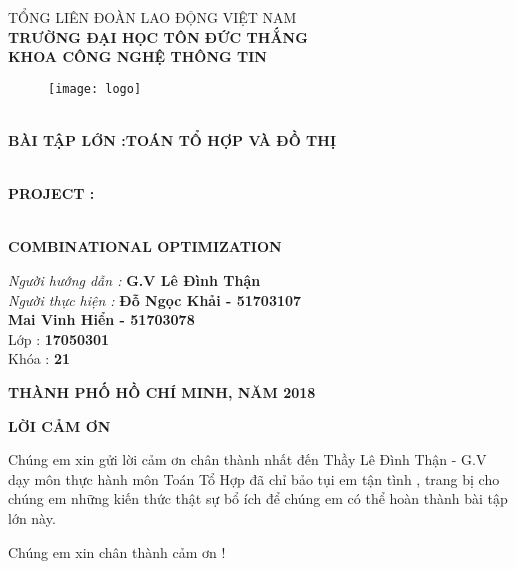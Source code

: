 \documentclass{article}
\begin{document}
	\begin{center}
		\fontsize{14pt}{11pt}\selectfont
		TỔNG LIÊN ĐOÀN LAO ĐỘNG VIỆT NAM
		\textbf{\\TRƯỜNG ĐẠI HỌC TÔN ĐỨC THẮNG}
		\textbf{\\KHOA CÔNG NGHỆ THÔNG TIN}
	\begin{figure}[!ht]
		\centering
		\texttt{[image: logo]}
	\end{figure}
		\fontsize{16pt}{12pt}\selectfont
		\textbf{\\BÀI TẬP LỚN :TOÁN TỔ HỢP VÀ ĐỒ THỊ}
		\vspace{1cm}
		\begin{center}
			\fontsize{22pt}{11pt}\selectfont
			\textbf{\\PROJECT :}
			
			\textbf{\\COMBINATIONAL OPTIMIZATION}
		\end{center}
		\vspace{2cm}
		\begin{flushright}
			\fontsize{14pt}{12pt}\selectfont
			\textit{Người hướng dẫn : }
			\textbf{G.V Lê Đình Thận }
			\vspace{0.2cm}
			\textit{\\Người thực hiện : }
			\textbf{Đỗ Ngọc Khải - 51703107}
			\vspace{0.2cm}
			\textbf{\\Mai Vinh Hiển - 51703078}
			\vspace{0.2cm}
			\\Lớp : \textbf{17050301}
			\vspace{0.2cm}
			\\Khóa : \textbf{21}
		\end{flushright}
		\vspace{1cm}
		\centering
		\textbf{THÀNH PHỐ HỒ CHÍ MINH, NĂM 2018}
	\end{center}
\newpage
	\begin{center}
		\fontsize{16pt}{12pt}\selectfont
		\textbf{LỜI CẢM ƠN}
	\end{center}
		\fontsize{13pt}{18pt}\selectfont
		\bigskip
		\hspace{0.86cm} Chúng em xin gửi lời cảm ơn chân thành nhất đến Thầy Lê Đình Thận - G.V dạy môn thực hành môn Toán Tổ Hợp đã chỉ bảo tụi em tận tình , trang bị cho chúng em những kiến thức thật sự bổ ích để chúng em  có thể hoàn thành bài tập lớn này.
		\begin{flushleft}
		\hspace{0.86cm} 
		Chúng em xin chân thành cảm ơn !
		\end{flushleft}
\end{document}
